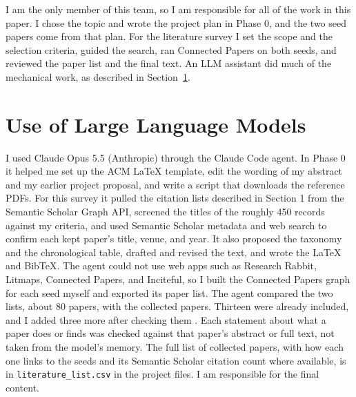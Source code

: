 \documentclass[sigconf,nonacm]{acmart}
\begin{document}
I am the only member of this team, so I am responsible for all of the work in this paper. I chose the topic and wrote the project plan in Phase 0, and the two seed papers come from that plan. For the literature survey I set the scope and the selection criteria, guided the search, ran Connected Papers on both seeds, and reviewed the paper list and the final text. An LLM assistant did much of the mechanical work, as described in Section~\ref{sec:llm}.

\section{Use of Large Language Models}
\label{sec:llm}

I used Claude Opus 5.5 (Anthropic) through the Claude Code agent. In Phase 0 it helped me set up the ACM LaTeX template, edit the wording of my abstract and my earlier project proposal, and write a script that downloads the reference PDFs. For this survey it pulled the citation lists described in Section 1 from the Semantic Scholar Graph API, screened the titles of the roughly 450 records against my criteria, and used Semantic Scholar metadata and web search to confirm each kept paper's title, venue, and year. It also proposed the taxonomy and the chronological table, drafted and revised the text, and wrote the LaTeX and BibTeX. The agent could not use web apps such as Research Rabbit, Litmaps, Connected Papers, and Inciteful, so I built the Connected Papers graph for each seed myself and exported its paper list. The agent compared the two lists, about 80 papers, with the collected papers. Thirteen were already included, and I added three more after checking them \cite{hekler2023tta,yang2023beyond,tian2024fairdomain}. Each statement about what a paper does or finds was checked against that paper's abstract or full text, not taken from the model's memory. The full list of collected papers, with how each one links to the seeds and its Semantic Scholar citation count where available, is in \texttt{literature\_list.csv} in the project files. I am responsible for the final content.



\end{document}
